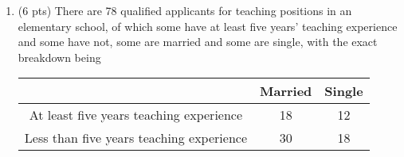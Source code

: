 \documentclass[11pt]{article}
\renewcommand{\Pr}{\ensuremath{\mathbf{Pr}}\xspace}
\begin{document}
\begin{description}
\begin{enumerate}


 \item (6 pts)
There are 78 qualified applicants for teaching positions in an elementary school, of which some have at least five years' teaching experience and some have not, some are married and some are single, with the exact breakdown being

\begin{center}
\begin{tabular}{|c|c|c|} \hline
& Married & Single
 \\ \hline
At least five years teaching experience & 18 & 12
  \\ \hline
Less than five years teaching experience & 30 & 18
 \\ \hline
\end{tabular}
\end{center}


\end{enumerate}
\end{description}
\end{document}

